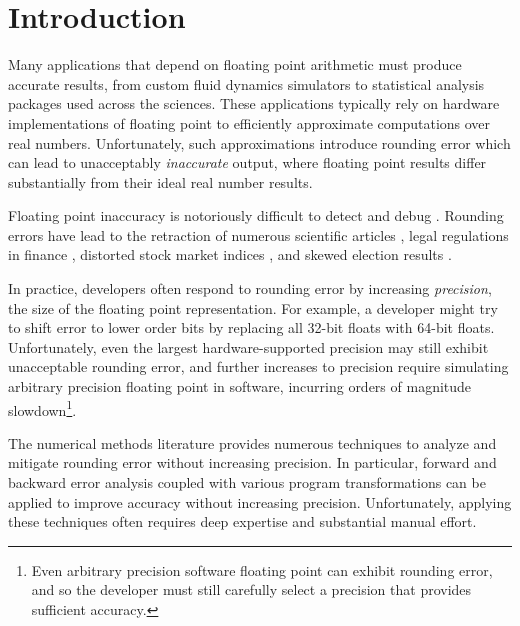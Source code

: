 \documentclass[paper.tex]{subfiles}
\begin{document}
\section{Introduction}
\label{sec:introduction}

Many applications that depend on floating point arithmetic must
produce accurate results, from custom fluid dynamics simulators to
statistical analysis packages used across the sciences.  These
applications typically rely on hardware implementations of floating
point to efficiently approximate computations over real numbers.
Unfortunately, such approximations introduce rounding error which can
lead to unacceptably \textit{inaccurate} output, where floating point
results differ substantially from their ideal real number results.


Floating point inaccuracy is notoriously difficult to detect and debug
.  Rounding errors have lead to the retraction of
numerous scientific articles , legal regulations in finance
, distorted stock market indices , and skewed
election results .

In practice, developers often respond to rounding error by increasing
\textit{precision}, the size of the floating point representation.
For example, a developer might try to shift error to lower order bits
by replacing all 32-bit floats with 64-bit floats.  Unfortunately,
even the largest hardware-supported precision may still exhibit
unacceptable rounding error, and further increases to precision
require simulating arbitrary precision floating point in software,
incurring orders of magnitude slowdown\footnote{Even arbitrary
  precision software floating point can exhibit rounding error, and so
  the developer must still carefully select a precision that provides
  sufficient accuracy.}.

 The numerical methods literature provides numerous
techniques to analyze and mitigate rounding error without increasing
precision.  In
particular, forward and backward error analysis  coupled
with various program transformations  can be applied to
improve accuracy without increasing precision.  Unfortunately,
applying these techniques often requires deep expertise and
substantial manual effort.
\end{document}
